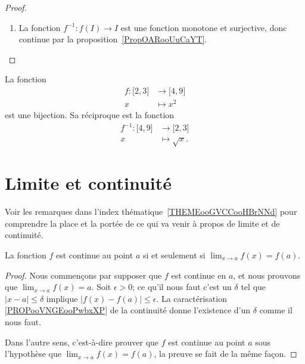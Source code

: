 \begin{proof}
\begin{enumerate}
		\item

		      La fonction \( f^{-1}\colon f(I)\to I\) est une fonction monotone et surjective, donc continue par la proposition~\ref{PropOARooUuCaYT}.

	\end{enumerate}
\end{proof}

\begin{example}
	La fonction
	\begin{equation}
		\begin{aligned}
			f\colon \mathopen[ 2 , 3 \mathclose] & \to \mathopen[ 4 , 9 \mathclose] \\
			x                                    & \mapsto x^2
		\end{aligned}
	\end{equation}
	est une bijection. Sa réciproque est la fonction
	\begin{equation}
		\begin{aligned}
			f^{-1}\colon \mathopen[ 4 , 9 \mathclose] & \to \mathopen[ 2 , 3 \mathclose] \\
			x                                         & \mapsto \sqrt{x}.
		\end{aligned}
	\end{equation}
\end{example}

\section{Limite et continuité}
\label{SecLimiteFontion}

Voir les remarques dans l'index thématique~\ref{THEMEooGVCCooHBrNNd} pour comprendre la place et la portée de ce qui va venir à propos de limite et de continuité.

\begin{theorem}           \label{ThoLimCont}
	La fonction $f$ est continue au point $a$ si et seulement si $\lim_{x\to a}f(x)=f(a)$.
\end{theorem}

\begin{proof}
	Nous commençons par supposer que $f$ est continue en $a$, et nous prouvons que $\lim_{x\to a}f(x)=a$. Soit $\epsilon>0$; ce qu'il nous faut c'est un $\delta$ tel que $| x-a |\leq\delta$ implique $| f(x)-f(a) |\leq\epsilon$. La caractérisation \ref{PROPooVNGEooPwbxXP} de la continuité donne l'existence d'un $\delta$ comme il nous faut.

	Dans l'autre sens, c'est-à-dire prouver que $f$ est continue au point $a$ sous l'hypothèse que $\lim_{x\to a}f(x)=f(a)$, la preuve se fait de la même façon.
\end{proof}

